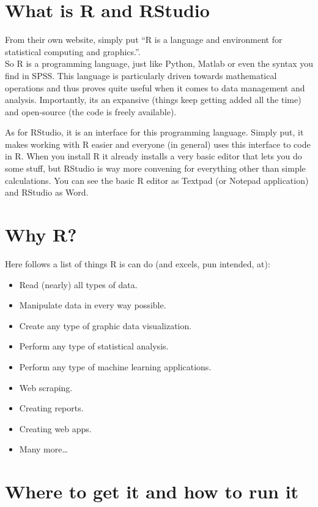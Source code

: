 \documentclass[
]{book}
\begin{document}
\hypertarget{what-is-r-and-rstudio}{%
\section{What is R and RStudio}\label{what-is-r-and-rstudio}}

From their own website, simply put ``R is a language and environment for statistical computing and graphics.''.\\
So R is a programming language, just like Python, Matlab or even the syntax you find in SPSS.
This language is particularly driven towards mathematical operations and thus proves quite useful when it comes to data management and analysis.
Importantly, its an expansive (things keep getting added all the time) and open-source (the code is freely available).

As for RStudio, it is an interface for this programming language.
Simply put, it makes working with R easier and everyone (in general) uses this interface to code in R.
When you install R it already installs a very basic editor that lets you do some stuff, but RStudio is way more convening for everything other than simple calculations.
You can see the basic R editor as Textpad (or Notepad application) and RStudio as Word.

\hypertarget{why-r}{%
\section{Why R?}\label{why-r}}

Here follows a list of things R is can do (and excels, pun intended, at):

\begin{itemize}
\item
  Read (nearly) all types of data.
\item
  Manipulate data in every way possible.
\item
  Create any type of graphic data visualization.
\item
  Perform any type of statistical analysis.
\item
  Perform any type of machine learning applications.
\item
  Web scraping.
\item
  Creating reports.
\item
  Creating web apps.
\item
  Many more\ldots{}
\end{itemize}

\hypertarget{where-to-get-it-and-how-to-run-it}{%
\section{Where to get it and how to run it}\label{where-to-get-it-and-how-to-run-it}}
\end{document}
